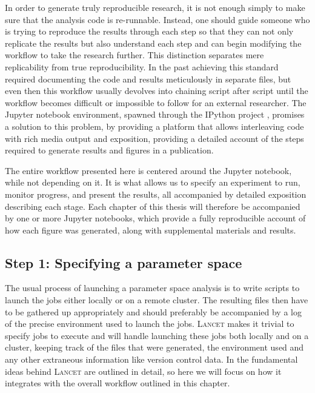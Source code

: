 In order to generate truly reproducible research, it is not enough
simply to make sure that the analysis code is re-runnable. Instead,
one should guide someone who is trying to reproduce the results
through each step so that they can not only replicate the results but
also understand each step and can begin modifying the workflow to take
the research further. This distinction separates mere replicability
from true reproducibility. In the past achieving this standard
required documenting the code and results meticulously in separate
files, but even then this workflow usually devolves into chaining
script after script until the workflow becomes difficult or impossible
to follow for an external researcher. The Jupyter notebook
environment, spawned through the IPython project \citep{Perez2007},
promises a solution to this problem, by providing a platform that
allows interleaving code with rich media output and exposition,
providing a detailed account of the steps required to generate results
and figures in a publication.

The entire workflow presented here is centered around the Jupyter
notebook, while not depending on it. It is what allows us to specify
an experiment to run, monitor progress, and present the results, all
accompanied by detailed exposition describing each stage. Each chapter
of this thesis will therefore be accompanied by one or more Jupyter
notebooks, which provide a fully reproducible account of how each
figure was generated, along with supplemental materials and results.

\subsection{Step 1: Specifying a parameter space}

The usual process of launching a parameter space analysis is to write
scripts to launch the jobs either locally or on a remote cluster. The
resulting files then have to be gathered up appropriately and should
preferably be accompanied by a log of the precise environment used to
launch the jobs. \textsc{Lancet} makes it trivial to specify jobs to
execute and will handle launching these jobs both locally and on a
cluster, keeping track of the files that were generated, the
environment used and any other extraneous information like version
control data. In \cite{Stevens2013a} the fundamental ideas behind
\textsc{Lancet} are outlined in detail, so here we will focus on how
it integrates with the overall workflow outlined in this chapter.

